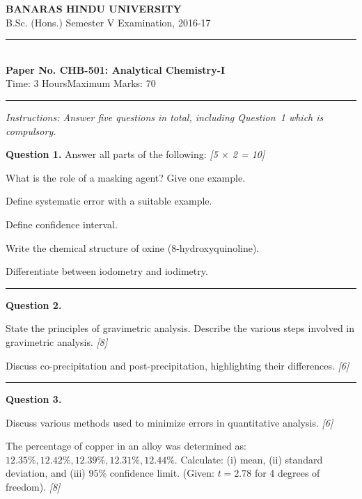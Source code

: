 \documentclass[11pt,a4paper]{article}
\newcommand{\pts}[1]{\hfill   \textit{[#1]}}
\begin{document}
\begin{center}
  {\large\bfseries BANARAS HINDU UNIVERSITY}\\[2pt]
  {\normalsize B.Sc. (Hons.) Semester V Examination, 2016-17}\\[6pt]
  \rule{0.8\linewidth}{0.5pt}\\[6pt]
  {\large\bfseries Paper No. CHB-501: Analytical Chemistry-I}\\[4pt]
  {\normalsize Time: 3 Hours\hfill Maximum Marks: 70}
\end{center}
\rule{\linewidth}{0.4pt}
\small



\noindent   \textit{Instructions: Answer five questions in total, including Question~1 which is compulsory.}

\normalsize
\bigskip




\noindent   \textbf{Question 1.} Answer all parts of the following: \pts{5 $ \times$ 2 = 10}

\begin{parts}
  \item What is the role of a masking agent? Give one example.
  \item Define systematic error with a suitable example.
  \item Define confidence interval.
  \item Write the chemical structure of oxine (8-hydroxyquinoline).
  \item Differentiate between iodometry and iodimetry.
\end{parts}

\medskip\rule{\linewidth}{0.2pt}




\noindent   \textbf{Question 2.}

\begin{parts}
  \item State the principles of gravimetric analysis. Describe the various steps involved in gravimetric analysis. \pts{8}
  \item Discuss co-precipitation and post-precipitation, highlighting their differences. \pts{6}
\end{parts}

\medskip\rule{\linewidth}{0.2pt}




\noindent   \textbf{Question 3.}

\begin{parts}
  \item Discuss various methods used to minimize errors in quantitative analysis. \pts{6}
  \item The percentage of copper in an alloy was determined as: $12.35\%, 12.42\%, 12.39\%, 12.31\%, 12.44\%$. Calculate: (i) mean, (ii) standard deviation, and (iii) $95\%$ confidence limit. (Given: $t = 2.78$ for 4 degrees of freedom). \pts{8}
\end{parts}
\end{document}
